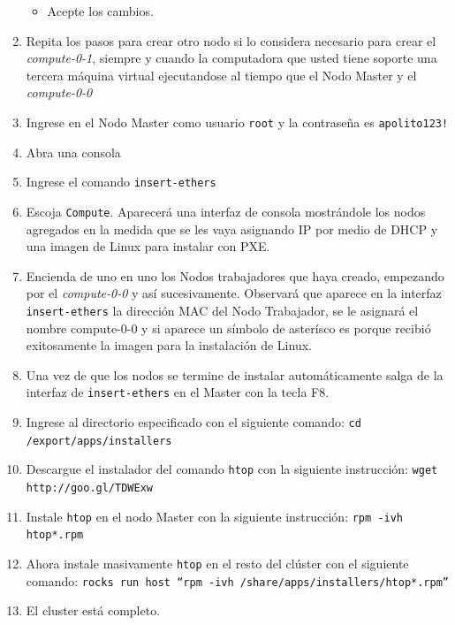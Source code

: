 \begin{enumerate}
\begin{itemize}
	\item Acepte los cambios.
\end{itemize}


\item Repita los pasos para crear otro nodo si lo considera necesario para crear el \textit{compute-0-1}, siempre y cuando la computadora que usted tiene soporte una tercera máquina virtual ejecutandose al tiempo que el Nodo Master y el \textit{compute-0-0}

\item Ingrese en el Nodo Master como usuario \texttt{root} y la contraseña es \texttt{apolito123!}

\item Abra una consola

\item Ingrese el comando \texttt{insert-ethers}

\item Escoja \texttt{Compute}. Aparecerá una interfaz de consola mostrándole los nodos agregados en la medida que se les vaya asignando IP por medio de DHCP y una imagen de Linux para instalar con PXE.

\item Encienda de uno en uno los Nodos trabajadores que haya creado, empezando por el \textit{compute-0-0} y así sucesivamente. Observará que aparece en la interfaz \texttt{insert-ethers} la dirección MAC del Nodo Trabajador, se le asignará el nombre compute-0-0 y si aparece un símbolo de asterísco es porque recibió exitosamente la imagen para la instalación de Linux.

\item Una vez de que los nodos se termine de instalar automáticamente salga de la interfaz de \texttt{insert-ethers} en el Master con la tecla F8.

\item Ingrese al directorio especificado con el siguiente comando: \texttt{cd /export/apps/installers}

\item Descargue el instalador del comando \texttt{htop} con la siguiente instrucción: \texttt{wget http://goo.gl/TDWExw}

\item Instale \texttt{htop} en el nodo Master con la siguiente instrucción: \texttt{rpm -ivh htop*.rpm}

\item Ahora instale masivamente \texttt{htop} en el resto del clúster con el siguiente comando: \texttt{rocks run host ``rpm -ivh /share/apps/installers/htop*.rpm''}

\item El cluster está completo.

\end{enumerate}

